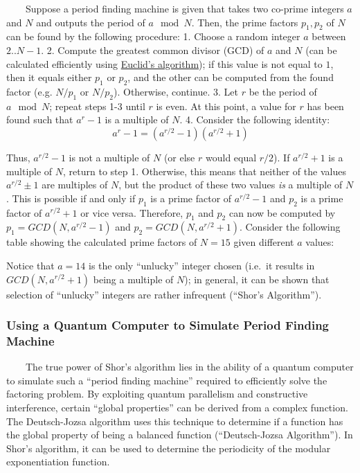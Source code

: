 \documentclass[11pt]{article}
\begin{document}
~~~~Suppose a period finding machine is given that takes two co-prime
integers \(a\) and \(N\) and outputs the period of \(a\mod N\). Then,
the prime factors \(p_1, p_2\) of \(N\) can be found by the following
procedure: 1. Choose a random integer \(a\) between \(2..N-1\). 2.
Compute the greatest common divisor (GCD) of \(a\) and \(N\) (can be
calculated efficiently using
\href{https://en.wikipedia.org/wiki/Euclidean_algorithm}{Euclid's
algorithm}); if this value is not equal to \(1\), then it equals either
\(p_1\) or \(p_2\), and the other can be computed from the found factor
(e.g. \(N/p_1\) or \(N/p_2\)). Otherwise, continue. 3. Let \(r\) be the
period of \(a\mod N\); repeat steps 1-3 until \(r\) is even. At this
point, a value for \(r\) has been found such that \(a^r-1\) is a
multiple of \(N\). 4. Consider the following identity:
\[a^r-1=(a^{r/2}-1)(a^{r/2}+1)\]

Thus, \(a^{r/2}-1\) is not a multiple of \(N\) (or else \(r\) would
equal \(r/2\)). If \(a^{r/2}+1\) is a multiple of \(N\), return to step
1. Otherwise, this means that neither of the values \(a^{r/2}\pm 1\) are
multiples of \(N\), but the product of these two values \emph{is} a
multiple of \(N\). This is possible if and only if \(p_1\) is a prime
factor of \(a^{r/2}-1\) and \(p_2\) is a prime factor of \(a^{r/2}+1\)
or vice versa. Therefore, \(p_1\) and \(p_2\) can now be computed by
\(p_1=GCD(N, a^{r/2}-1)\) and \(p_2=GCD(N, a^{r/2}+1)\). Consider the
following table showing the calculated prime factors of \(N=15\) given
different \(a\) values:

Notice that \(a=14\) is the only ``unlucky'' integer chosen (i.e.~it
results in \(GCD(N, a^{r/2}+1)\) being a multiple of \(N\)); in general,
it can be shown that selection of ``unlucky'' integers are rather
infrequent (``Shor's Algorithm'').

    \hypertarget{using-a-quantum-computer-to-simulate-period-finding-machine}{%
\subsubsection{Using a Quantum Computer to Simulate Period Finding
Machine}\label{using-a-quantum-computer-to-simulate-period-finding-machine}}

~~~~The true power of Shor's algorithm lies in the ability of a quantum
computer to simulate such a ``period finding machine'' required to
efficiently solve the factoring problem. By exploiting quantum
parallelism and constructive interference, certain ``global properties''
can be derived from a complex function. The Deutsch-Jozsa algorithm uses
this technique to determine if a function has the global property of
being a balanced function (``Deutsch-Jozsa Algorithm''). In Shor's
algorithm, it can be used to determine the periodicity of the modular
exponentiation function.
\end{document}
